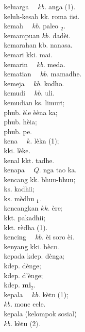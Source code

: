 \documentclass[10pt]{article}
\begin{document}
keluarga \(\quad k b\). anga (1).\\
keluh-kesah kk. roma iisi.\\
kemah \(\quad k b\). paleo \(_{2}\).\\
kemampuan \(k b\). dadèi.\\
kemarahan kb. nanasa.\\
kemari kki. mai.\\
kemarin \(\quad k b\). meda.\\
kematian \(\quad k b\). mamadhe.\\
kemeja \(\quad k b\). kodho.\\
kemudi \(\quad k b\). uli.\\
kemudian ks. limuri;\\
phub. èle èèna ka;\\
phub. hèia;\\
phub. pe.\\
kena \(\quad k\). lèka (1);\\
kki. lèke.\\
kenal kkt. tadhe.\\
kenapa \(\quad Q\). nga tao ka.\\
kencang kk. bhuu-bhuu;\\
ks. kadhii;\\
ks. mèdhu \({ }_{1}\).\\
kencangkan \(k k\). ère;\\
kkt. pakadhii;\\
kkt. rèdha (1).\\
kencing \(\quad k b\). èi soro èi.\\
kenyang kki. bècu.\\
kepada kdep. dènga;\\
kdep. dènge;\\
kdep. d'ènge;\\
kdep. \(\mathbf{m i}_{2}\).\\
kepala \(\quad k b\). kètu (1);\\
\(k b\). mone eele.\\
kepala (kelompok sosial)\\
\(k b\). kètu (2).
\end{document}
